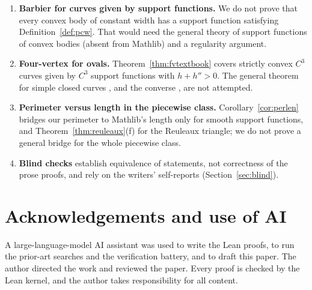 \documentclass[11pt]{article}
\theoremstyle{definition}
\theoremstyle{remark}
\begin{document}
\begin{enumerate}
\item \textbf{Barbier for curves given by support functions.} We do not prove that every convex body of
constant width has a support function satisfying Definition~\ref{def:pcw}. That would need the
general theory of support functions of convex bodies (absent from Mathlib) and a regularity argument.
\item \textbf{Four-vertex for ovals.} Theorem~\ref{thm:fvtextbook} covers strictly convex $C^3$ curves
given by $C^3$ support functions with $h+h''>0$. The general theorem for simple closed curves
\cite{kneser1912}, and the converse \cite{dahlberg2005}, are not attempted.
\item \textbf{Perimeter versus length in the piecewise class.} Corollary~\ref{cor:perlen} bridges our
perimeter to Mathlib's length only for smooth support functions, and Theorem~\ref{thm:reuleaux}(f) for
the Reuleaux triangle; we do not prove a general bridge for the whole piecewise class.
\item \textbf{Blind checks} establish equivalence of statements, not correctness of the prose
proofs, and rely on the writers' self-reports (Section~\ref{sec:blind}).
\end{enumerate}

\section*{Acknowledgements and use of AI}
A large-language-model AI assistant was used to write the Lean proofs, to run the prior-art searches
and the verification battery, and to draft this paper. The author directed the work and reviewed the
paper. Every proof is checked by the Lean kernel, and the author takes responsibility for all content.
\end{document}
